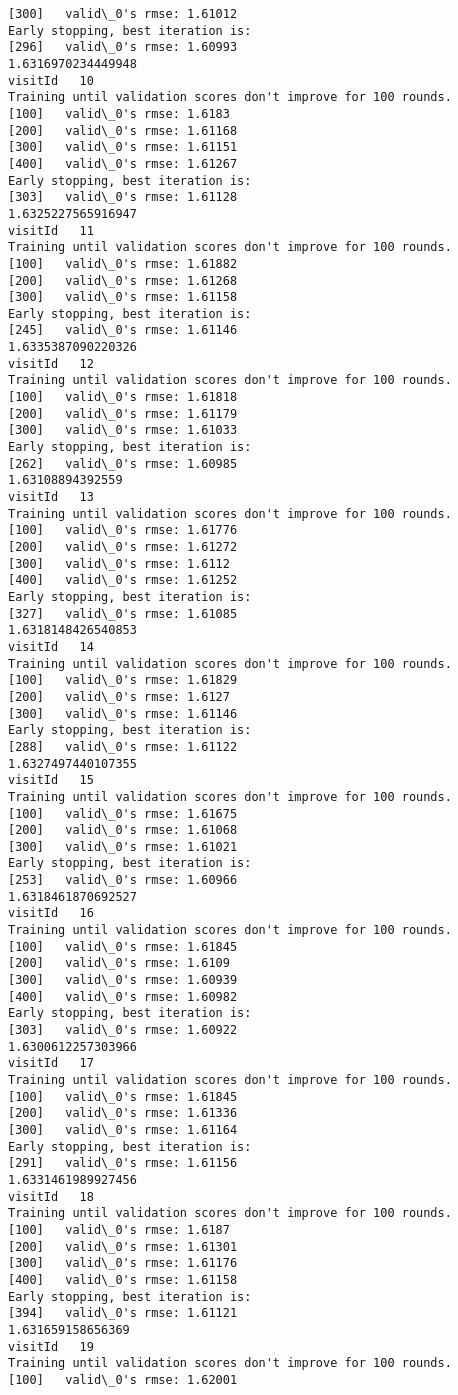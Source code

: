 \documentclass[11pt]{article}
\begin{document}
\begin{Verbatim}[commandchars=\\\{\}]
[300]	valid\_0's rmse: 1.61012
Early stopping, best iteration is:
[296]	valid\_0's rmse: 1.60993
1.6316970234449948
visitId   10
Training until validation scores don't improve for 100 rounds.
[100]	valid\_0's rmse: 1.6183
[200]	valid\_0's rmse: 1.61168
[300]	valid\_0's rmse: 1.61151
[400]	valid\_0's rmse: 1.61267
Early stopping, best iteration is:
[303]	valid\_0's rmse: 1.61128
1.6325227565916947
visitId   11
Training until validation scores don't improve for 100 rounds.
[100]	valid\_0's rmse: 1.61882
[200]	valid\_0's rmse: 1.61268
[300]	valid\_0's rmse: 1.61158
Early stopping, best iteration is:
[245]	valid\_0's rmse: 1.61146
1.6335387090220326
visitId   12
Training until validation scores don't improve for 100 rounds.
[100]	valid\_0's rmse: 1.61818
[200]	valid\_0's rmse: 1.61179
[300]	valid\_0's rmse: 1.61033
Early stopping, best iteration is:
[262]	valid\_0's rmse: 1.60985
1.63108894392559
visitId   13
Training until validation scores don't improve for 100 rounds.
[100]	valid\_0's rmse: 1.61776
[200]	valid\_0's rmse: 1.61272
[300]	valid\_0's rmse: 1.6112
[400]	valid\_0's rmse: 1.61252
Early stopping, best iteration is:
[327]	valid\_0's rmse: 1.61085
1.6318148426540853
visitId   14
Training until validation scores don't improve for 100 rounds.
[100]	valid\_0's rmse: 1.61829
[200]	valid\_0's rmse: 1.6127
[300]	valid\_0's rmse: 1.61146
Early stopping, best iteration is:
[288]	valid\_0's rmse: 1.61122
1.6327497440107355
visitId   15
Training until validation scores don't improve for 100 rounds.
[100]	valid\_0's rmse: 1.61675
[200]	valid\_0's rmse: 1.61068
[300]	valid\_0's rmse: 1.61021
Early stopping, best iteration is:
[253]	valid\_0's rmse: 1.60966
1.6318461870692527
visitId   16
Training until validation scores don't improve for 100 rounds.
[100]	valid\_0's rmse: 1.61845
[200]	valid\_0's rmse: 1.6109
[300]	valid\_0's rmse: 1.60939
[400]	valid\_0's rmse: 1.60982
Early stopping, best iteration is:
[303]	valid\_0's rmse: 1.60922
1.6300612257303966
visitId   17
Training until validation scores don't improve for 100 rounds.
[100]	valid\_0's rmse: 1.61845
[200]	valid\_0's rmse: 1.61336
[300]	valid\_0's rmse: 1.61164
Early stopping, best iteration is:
[291]	valid\_0's rmse: 1.61156
1.6331461989927456
visitId   18
Training until validation scores don't improve for 100 rounds.
[100]	valid\_0's rmse: 1.6187
[200]	valid\_0's rmse: 1.61301
[300]	valid\_0's rmse: 1.61176
[400]	valid\_0's rmse: 1.61158
Early stopping, best iteration is:
[394]	valid\_0's rmse: 1.61121
1.631659158656369
visitId   19
Training until validation scores don't improve for 100 rounds.
[100]	valid\_0's rmse: 1.62001

\end{Verbatim}
\end{document}
